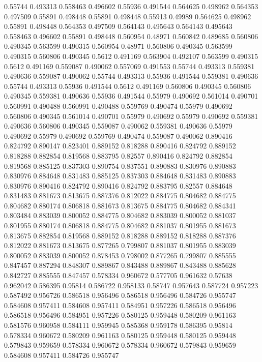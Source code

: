 0.55744 0.493313
0.558463 0.496602
0.55936 0.491544
0.564625 0.498962
0.564353 0.497509
0.55891 0.498448
0.55891 0.498448
0.55913 0.49989
0.564625 0.498962
0.55891 0.498448
0.564353 0.497509
0.564143 0.495643
0.564143 0.495643
0.558463 0.496602
0.55891 0.498448
0.560954 0.48971
0.560842 0.489685
0.560806 0.490345
0.563599 0.490315
0.560954 0.48971
0.560806 0.490345
0.563599 0.490315
0.560806 0.490345
0.5612 0.491169
0.563904 0.492107
0.563599 0.490315
0.5612 0.491169
0.559087 0.490062
0.557069 0.491553
0.55744 0.493313
0.559381 0.490636
0.559087 0.490062
0.55744 0.493313
0.55936 0.491544
0.559381 0.490636
0.55744 0.493313
0.55936 0.491544
0.5612 0.491169
0.560806 0.490345
0.560806 0.490345
0.559381 0.490636
0.55936 0.491544
0.55979 0.490692
0.561014 0.490701
0.560991 0.490488
0.560991 0.490488
0.559769 0.490474
0.55979 0.490692
0.560806 0.490345
0.561014 0.490701
0.55979 0.490692
0.55979 0.490692
0.559381 0.490636
0.560806 0.490345
0.559087 0.490062
0.559381 0.490636
0.55979 0.490692
0.55979 0.490692
0.559769 0.490474
0.559087 0.490062
0.890416 0.824792
0.890147 0.823401
0.889152 0.818288
0.890416 0.824792
0.889152 0.818288
0.882854 0.819568
0.883795 0.82557
0.890416 0.824792
0.882854 0.819568
0.885125 0.837303
0.890754 0.837551
0.890883 0.830976
0.890883 0.830976
0.884648 0.831483
0.885125 0.837303
0.884648 0.831483
0.890883 0.830976
0.890416 0.824792
0.890416 0.824792
0.883795 0.82557
0.884648 0.831483
0.881673 0.813675
0.887376 0.812022
0.884775 0.804682
0.884775 0.804682
0.880174 0.806818
0.881673 0.813675
0.884775 0.804682
0.884341 0.803484
0.883039 0.800052
0.884775 0.804682
0.883039 0.800052
0.881037 0.801955
0.880174 0.806818
0.884775 0.804682
0.881037 0.801955
0.881673 0.813675
0.882854 0.819568
0.889152 0.818288
0.889152 0.818288
0.887376 0.812022
0.881673 0.813675
0.877265 0.799807
0.881037 0.801955
0.883039 0.800052
0.883039 0.800052
0.878453 0.798002
0.877265 0.799807
0.885555 0.847457
0.887294 0.848307
0.889867 0.843488
0.889867 0.843488
0.885628 0.842727
0.885555 0.847457
0.578334 0.960672
0.577705 0.961632
0.57638 0.962042
0.586395 0.95814
0.586722 0.958133
0.58747 0.957643
0.587724 0.957223
0.587492 0.956726
0.586518 0.956496
0.586518 0.956496
0.584726 0.955747
0.584608 0.957411
0.584608 0.957411
0.584951 0.957226
0.586518 0.956496
0.586518 0.956496
0.584951 0.957226
0.580125 0.959448
0.580209 0.961163
0.581576 0.960958
0.584111 0.959945
0.585368 0.959178
0.586395 0.95814
0.578334 0.960672
0.580209 0.961163
0.580125 0.959448
0.580125 0.959448
0.579843 0.959659
0.578334 0.960672
0.578334 0.960672
0.579843 0.959659
0.584608 0.957411
0.584726 0.955747
